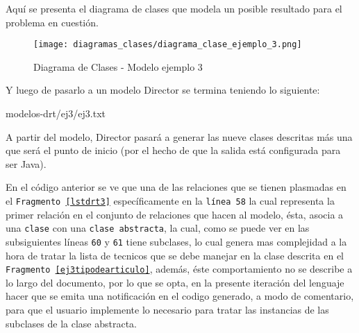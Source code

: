 Aquí se presenta el diagrama de clases que modela un posible resultado para el
problema en cuestión.

\begin{figure}[H]
	\centering
	\texttt{[image: diagramas\_clases/diagrama\_clase\_ejemplo\_3.png]}
	\caption{Diagrama de Clases - Modelo ejemplo 3}
	\label{fig:dc_mod_ej_3}
\end{figure}

Y luego de pasarlo a un modelo Director se termina teniendo lo siguiente:


{modelos-drt/ej3/ej3.txt}

A partir del modelo, Director pasará a generar las nueve clases descritas más
una que será el punto de inicio (por el hecho de que la salida está configurada
para ser Java).











En el código anterior se ve que una de las relaciones que se tienen plasmadas
en el \texttt{Fragmento \ref{lstdrt3}} específicamente en la \texttt{línea 58}
la cual representa la primer relación en el conjunto de relaciones que hacen al
modelo, ésta, asocia a una \texttt{clase} con una \texttt{clase abstracta}, la
cual, como se puede ver en las subsiguientes líneas \texttt{60} y \texttt{61}
tiene subclases, lo cual genera mas complejidad a la hora de tratar la lista de
tecnicos que se debe manejar en la clase descrita en el \texttt{Fragmento
\ref{ej3tipodearticulo}}, además, éste comportamiento no se describe a lo
largo del documento, por lo que se opta, en la presente iteración del lenguaje
hacer que se emita una notificación en el codigo generado, a modo de comentario, para
que el usuario implemente lo necesario para tratar las instancias de las
subclases de la clase abstracta.

